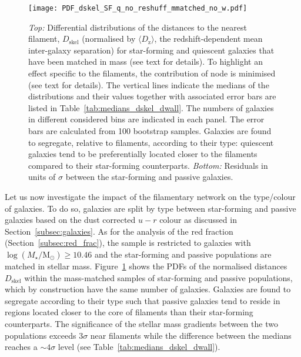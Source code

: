 \documentclass[useAMS,usenatbib]{mnras}
\newcommand{\Mstardot}{M\ensuremath{_{\star}} / \mathrm{M}\ensuremath{_{\odot}}}
\begin{document}
\begin{figure}
\texttt{[image: PDF\_dskel\_SF\_q\_no\_reshuff\_mmatched\_no\_w.pdf]} 
\caption{\textit{Top:} Differential distributions of the distances to the nearest filament, $D_{\mathrm{skel}}$ (normalised by $\langle D_{\mathrm{z}} \rangle$, the redshift-dependent mean inter-galaxy separation) for star-forming and quiescent galaxies that have been matched in mass (see text for details). 
To highlight an effect specific to the filaments, the contribution of node is minimised (see text for details).
The vertical lines indicate the medians of the distributions and their values together with associated error bars are listed in Table~\ref{tab:medians_dskel_dwall}. The numbers of galaxies in different considered bins are indicated in each panel. The error bars are calculated from 100 bootstrap samples.
Galaxies are found to segregate, relative to filaments, according to their type: quiescent galaxies tend to be preferentially located closer to the filaments compared to their star-forming counterparts. 
\textit{Bottom:} Residuals in units of $\sigma$  between the star-forming and passive galaxies.  
}
\label{Fig:PDF_dskel_type}
\end{figure}

Let us now investigate the impact of the filamentary network on the type/colour of galaxies. 
To do so, galaxies are split by type between star-forming and passive galaxies based on the dust corrected $u-r$ colour as discussed in Section~\ref{subsec:galaxies}. 
As for the analysis of the red fraction (Section~\ref{subsec:red_frac}), the sample is restricted to galaxies with $\log(\Mstardot) \geq 10.46$ and the star-forming and passive populations are matched in stellar mass.
Figure~\ref{Fig:PDF_dskel_type} shows the PDFs of the normalised distances $D_{\mathrm{skel}}$ within the mass-matched samples of star-forming and passive populations, which by construction have the same number of galaxies. 
Galaxies are found to segregate according to their type such that passive galaxies tend to reside in regions located closer to the core of filaments than their star-forming counterparts. 
The significance of the stellar mass gradients between the two populations exceeds $3\sigma$ near filaments while the difference between the medians reaches a $\sim 4\sigma$ level (see Table~\ref{tab:medians_dskel_dwall}).  


\end{document}
